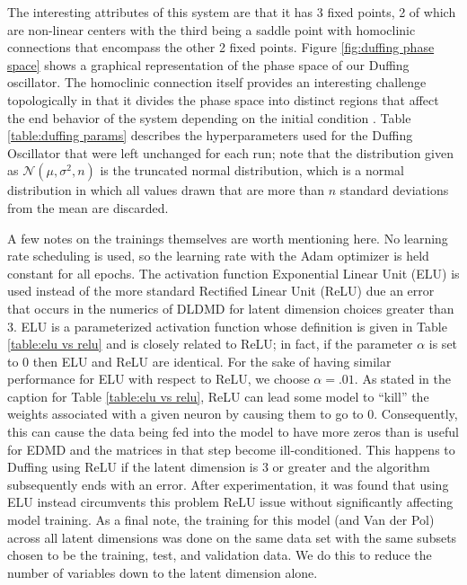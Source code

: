 The interesting attributes of this system are that it has 3 fixed points, 2 of which are non-linear 
centers with the third being a saddle point with homoclinic connections that encompass the other 2 fixed 
points. Figure \ref{fig:duffing phase space} shows a graphical representation of the phase space of our 
Duffing oscillator. The homoclinic connection itself provides an interesting challenge topologically in 
that it divides the phase space into distinct regions that affect the end behavior of the system depending
on the initial condition \cite{strogatz:2000}. Table \ref{table:duffing params} describes the hyperparameters 
used for the 
Duffing Oscillator that were left unchanged for each run; note that the distribution given as 
$\mathcal{N}(\mu, \sigma^2, n)$ is the truncated normal distribution, which is a normal distribution
in which all values drawn that are more than $n$ standard deviations from the mean are discarded. 

A few notes on the trainings themselves are worth mentioning here. No learning rate scheduling is used,
so the learning rate with the Adam optimizer is held constant for all epochs. The activation function
Exponential Linear Unit (ELU) is used instead of the more standard Rectified Linear Unit (ReLU) due an 
error that occurs in the numerics of DLDMD for latent dimension choices greater than 3. ELU is a 
parameterized activation function whose definition is given in Table \ref{table:elu vs relu} and is closely
related to ReLU; in fact, if the parameter $\alpha$ is set to 0 then ELU and ReLU are identical. For the
sake of having similar performance for ELU with respect to ReLU, we choose $\alpha = .01$.
As stated in the caption for Table \ref{table:elu vs relu}, ReLU can lead some model to ``kill'' the 
weights associated with a given neuron by causing them to go to 0. Consequently, this can cause the 
data being fed into the model to have more zeros than is useful for EDMD and the matrices in that step 
become ill-conditioned. This happens to Duffing using ReLU if the 
latent dimension is 3 or greater and the algorithm subsequently ends with an error. After experimentation, 
it was found that using ELU instead circumvents this problem ReLU issue without significantly affecting 
model training. As a final note, the training for this model (and Van der Pol) across all latent dimensions 
was done on the 
same data set with the same subsets chosen to be the training, test, and validation data. We do this to
reduce the number of variables down to the latent dimension alone.


